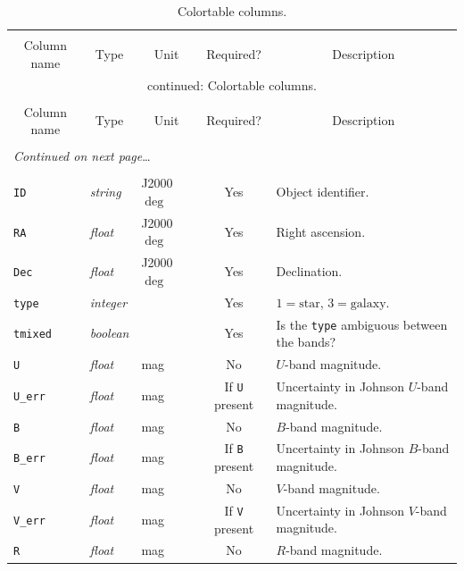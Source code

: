 \documentclass{report}
\begin{document}
\begin{center}
\begin{longtable}{lllcp{2in}}
\caption[Colortable columns.]{Colortable columns.}
\label{tab:colortable} \\
  \hline \hline \\[-2ex]
  \multicolumn{1}{c}{Column name} &
  \multicolumn{1}{c}{Type} &
  \multicolumn{1}{c}{Unit} &
  \multicolumn{1}{c}{Required?} &
  \multicolumn{1}{c}{Description} \\[0.5ex] \hline
\endfirsthead
\multicolumn{5}{c}{{\tablename} \thetable{} continued: Colortable columns.} \\[0.5ex]
  \hline \hline \\[-2ex]
  \multicolumn{1}{c}{Column name} &
  \multicolumn{1}{c}{Type} &
  \multicolumn{1}{c}{Unit} &
  \multicolumn{1}{c}{Required?} &
  \multicolumn{1}{c}{Description} 
\\[0.5ex] \hline
  \\[-1.8ex]
\endhead
\multicolumn{5}{l}{{{\it Continued on next page}\ldots}} \\
\endfoot
  \\[-1.8ex] \hline \hline
\endlastfoot
\verb|ID| & {\it string} & J2000 $\deg$ & Yes & Object identifier. \\
\verb|RA| & {\it float} & J2000 $\deg$ & Yes & Right ascension. \\
\verb|Dec| & {\it float} & J2000 $\deg$ & Yes & Declination. \\
\verb|type| & {\it integer} & & Yes & $1=\textrm{star}$, $3=\textrm{galaxy}$. \\
\verb|tmixed| & {\it boolean} & & Yes & Is the \verb|type| ambiguous between the bands? \\
\verb|U| & {\it float} & mag & No & $U$-band magnitude. \\
\verb|U_err| & {\it float} & mag & If \verb|U| present & Uncertainty in Johnson $U$-band magnitude. \\
\verb|B| & {\it float} & mag & No & $B$-band magnitude. \\
\verb|B_err| & {\it float} & mag & If \verb|B| present & Uncertainty in Johnson $B$-band magnitude. \\
\verb|V| & {\it float} & mag & No & $V$-band magnitude. \\
\verb|V_err| & {\it float} & mag & If \verb|V| present & Uncertainty in Johnson $V$-band magnitude. \\
\verb|R| & {\it float} & mag & No & $R$-band magnitude. \\

\end{longtable}
\end{center}
\end{document}

